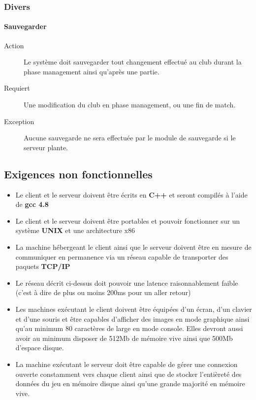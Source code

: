 \documentclass[a4paper]{article}
\begin{document}
\subsubsection{Divers}
\paragraph{Sauvegarder}
\begin{description}
\item[Action] Le système doit sauvegarder tout changement effectué au \gls{club} durant la phase management ainsi qu'après une partie.
\item[Requiert] Une modification du \gls{club} en phase management, ou une fin de match.
\item[Exception] Aucune sauvegarde ne sera effectuée par le module de sauvegarde si le \gls{serveur} plante.
\end{description}


\subsection{Exigences non fonctionnelles}
\label{enf}
\begin{itemize}
\item Le \gls{client} et le \gls{serveur} doivent être écrits en \textbf{C++} et seront compilés à l'aide de \textbf{gcc 4.8}
\item Le \gls{client} et le \gls{serveur} doivent être portables et pouvoir fonctionner sur un système \textbf{UNIX} et une architecture x86
\item La machine hébergeant le \gls{client} ainsi que le \gls{serveur} doivent être en mesure de communiquer en permanence via un réseau capable de transporter des paquets \textbf{TCP/IP}
\item Le réseau décrit ci-dessus doit pouvoir une latence raisonnablement faible (c'est à dire de plus ou moins 200ms pour un aller retour)
\item Les machines exécutant le \gls{client} doivent être équipées d'un écran, d'un clavier et d'une souris et être capables d'afficher des images en mode graphique ainsi qu'au minimum 80 caractères de large en mode console. Elles devront aussi avoir au minimum disposer de 512Mb de mémoire vive ainsi que 500Mb d'espace disque.
\item La machine exécutant le \gls{serveur} doit être capable de gérer une connexion ouverte constamment vers chaque \gls{client} ainsi que de stocker l'entièreté des données du jeu en mémoire disque ainsi qu'une grande majorité en mémoire vive.
\end{itemize}
\end{document}
